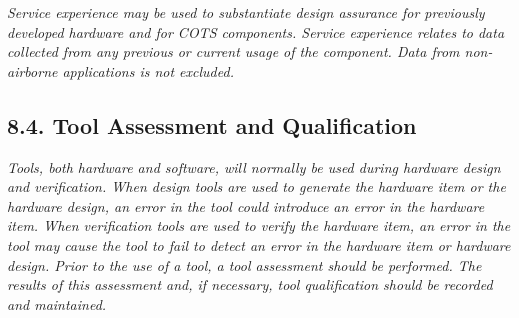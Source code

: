 \documentclass[]{article}
\begin{document}
\emph{Service experience may be used to substantiate design assurance
for previously developed hardware and for COTS components. Service
experience relates to data collected from any previous or current usage
of the component. Data from non-airborne applications is not excluded.}

\subsection{8.4. Tool Assessment and
Qualification}\label{tool-assessment-and-qualification}

\emph{Tools, both hardware and software, will normally be used during
hardware design and verification. When design tools are used to generate
the hardware item or the hardware design, an error in the tool could
introduce an error in the hardware item. When verification tools are
used to verify the hardware item, an error in the tool may cause the
tool to fail to detect an error in the hardware item or hardware design.
Prior to the use of a tool, a tool assessment should be performed. The
results of this assessment and, if necessary, tool qualification should
be recorded and maintained.}
\end{document}
